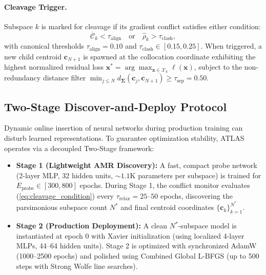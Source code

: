 \documentclass[runningheads]{llncs}
\begin{document}
\paragraph{Cleavage Trigger.} Subspace $k$ is marked for cleavage if its gradient conflict satisfies either condition:
\begin{equation}
\label{eq:cleavage_condition}
\overline{\mathcal{C}}_k < \tau_{\text{align}} \quad \text{or} \quad \hat{\rho}_k > \tau_{\text{clash}},
\end{equation}
with canonical thresholds $\tau_{\text{align}} = 0.10$ and $\tau_{\text{clash}} \in [0.15, 0.25]$. When triggered, a new child centroid $\mathbf{c}_{N+1}$ is spawned at the collocation coordinate exhibiting the highest normalized residual loss $\mathbf{x}^* = \arg\max_{\mathbf{x} \in \mathcal{X}_k} \ell(\mathbf{x})$, subject to the non-redundancy distance filter $\min_{j \le N} d_{\boldsymbol{\Sigma}}(\mathbf{c}_j, \mathbf{c}_{N+1}) \ge \tau_{\text{sep}} = 0.50$.

\subsection{Two-Stage Discover-and-Deploy Protocol}
Dynamic online insertion of neural networks during production training can disturb learned representations. To guarantee optimization stability, ATLAS operates via a decoupled Two-Stage framework:
\begin{itemize}
    \item \textbf{Stage 1 (Lightweight AMR Discovery):} A fast, compact probe network (2-layer MLP, 32 hidden units, $\sim 1.1\text{K}$ parameters per subspace) is trained for $E_{\text{probe}} \in [300, 800]$ epochs. During Stage 1, the conflict monitor evaluates (\ref{eq:cleavage_condition}) every $\tau_{\text{relax}} = 25\text{--}50$ epochs, discovering the parsimonious subspace count $N^*$ and final centroid coordinates $\{\mathbf{c}_k\}_{k=1}^{N^*}$.
    \item \textbf{Stage 2 (Production Deployment):} A clean $N^*$-subspace model is instantiated at epoch 0 with Xavier initialization (using localized 4-layer MLPs, 44--64 hidden units). Stage 2 is optimized with synchronized AdamW (1000--2500 epochs) and polished using Combined Global L-BFGS (up to 500 steps with Strong Wolfe line searches).
\end{itemize}
\end{document}
